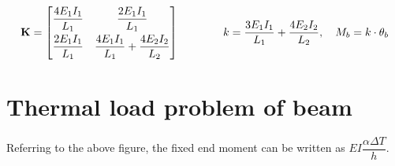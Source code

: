 \begin{example}
\begin{fig}
  
\end{fig}
\begin{equation*}
  \mathbf{K} = \begin{bmatrix}\dfrac{4E_1I_1}{L_1} & \dfrac{2E_1I_1}{L_1}\\[8pt] \dfrac{2E_1I_1}{L_1} & \dfrac{4E_1I_1}{L_1}+\dfrac{4E_2I_2}{L_2}\end{bmatrix}
  \qquad\qquad
  k = \frac{3E_1I_1}{L_1} + \frac{4E_2I_2}{L_2},\quad M_b = k\cdot\theta_b
\end{equation*}
\end{example}

\section{Thermal load problem of beam}
\begin{fig}
  
\end{fig}
Referring to the above figure, the fixed end moment can be written as $EI\dfrac{\alpha\Delta T}{h}$.
